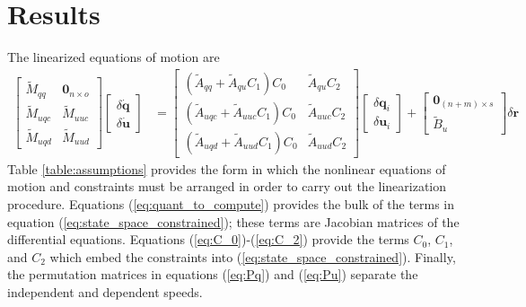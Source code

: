 \documentclass[smallcondensed]{svjour3}                     %
\begin{document}
\section{Results}
\label{sec:results}
The linearized equations of motion are
\begin{align}
  \label{eq:state_space_constrained}
  \left[
    \begin{array}{cc}
      \tilde{M}_{qq} & \bm{0}_{n \times o} \\
      \tilde{M}_{uqc} & \tilde{M}_{uuc} \\
      \tilde{M}_{uqd} & \tilde{M}_{uud}
    \end{array}
    \right]
    \left[
      \begin{array}{c}
        \delta \bm{\dot{q}} \\
        \delta \bm{\dot{u}}
      \end{array}
    \right]
   &=
   \left[
     \begin{array}{cc}
       (\tilde{A}_{qq} + \tilde{A}_{qu} C_1 ) C_0 & \tilde{A}_{qu} C_2 \\
       (\tilde{A}_{uqc} + \tilde{A}_{uuc} C_1 ) C_0 & \tilde{A}_{uuc} C_2\\
       (\tilde{A}_{uqd} + \tilde{A}_{uud} C_1 ) C_0 & \tilde{A}_{uud} C_2
     \end{array}
   \right]
    \left[
      \begin{array}{c}
        \delta \bm{q}_i \\
        \delta \bm{u}_i
      \end{array}
    \right]
    +
    \left[
      \begin{array}{c}
        \bm{0}_{(n+m) \times s} \\
        \tilde{B}_{u}
      \end{array}
    \right]
    \delta \bm{r}
\end{align}
Table \ref{table:assumptions} provides the form in which the nonlinear
equations of motion and constraints must be arranged in order to carry out the
linearization procedure.  Equations (\ref{eq:quant_to_compute}) provides the
bulk of the terms in equation (\ref{eq:state_space_constrained}); these terms
are Jacobian matrices of the differential equations. Equations
(\ref{eq:C_0})-(\ref{eq:C_2}) provide the terms $C_0$, $C_1$, and $C_2$ which
embed the constraints into (\ref{eq:state_space_constrained}). Finally, the
permutation matrices in equations (\ref{eq:Pq}) and (\ref{eq:Pu}) separate the
independent and dependent speeds.
\end{document}
